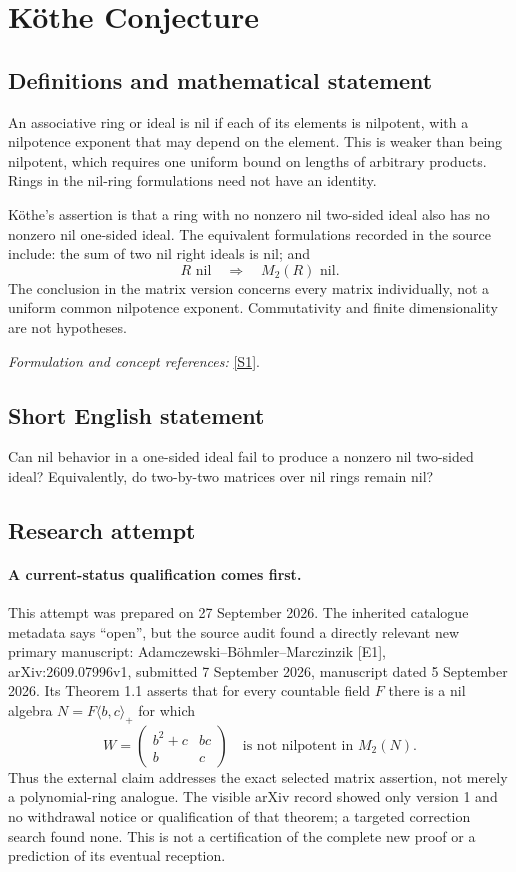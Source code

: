 \documentclass[11pt]{article}
\begin{document}
\section*{\texorpdfstring{Köthe Conjecture}{Köthe Conjecture}}\label{1103}
\subsection{Definitions and mathematical statement}
An associative ring or ideal is nil if each of its elements is nilpotent, with a nilpotence exponent that may depend on the element. This is weaker than being nilpotent, which requires one uniform bound on lengths of arbitrary products. Rings in the nil-ring formulations need not have an identity.

K\"othe's assertion is that a ring with no nonzero nil two-sided ideal also has no nonzero nil one-sided ideal. The equivalent formulations recorded in the source include: the sum of two nil right ideals is nil; and
\[
 R\text{ nil}\quad\Longrightarrow\quad M_2(R)\text{ nil}.
\]
The conclusion in the matrix version concerns every matrix individually, not a uniform common nilpotence exponent. Commutativity and finite dimensionality are not hypotheses.
\par\smallskip\textit{Formulation and concept references:} \href{https://www.mathunion.org/fileadmin/ICM/Proceedings/ICM2006.2/ICM2006.2.ocr.pdf}{[S1]}.

\subsection{Short English statement}
Can nil behavior in a one-sided ideal fail to produce a nonzero nil two-sided ideal? Equivalently, do two-by-two matrices over nil rings remain nil?
\subsection{Research attempt}
\paragraph{A current-status qualification comes first.}
This attempt was prepared on 27 September 2026. The inherited catalogue
metadata says ``open'', but the source audit found a directly relevant
new primary manuscript: Adamczewski--B\"ohmler--Marczinzik [E1],
arXiv:2609.07996v1, submitted 7 September 2026, manuscript dated
5 September 2026. Its Theorem 1.1 asserts that for every countable field
$F$ there is a nil algebra $N=F\langle b,c\rangle_+$ for which
\[
 W=\begin{pmatrix}b^2+c&bc\\ b&c\end{pmatrix}
 \quad\text{is not nilpotent in }M_2(N).
\]
Thus the external claim addresses the exact selected matrix assertion,
not merely a polynomial-ring analogue. The visible arXiv record showed
only version 1 and no withdrawal notice or qualification of that theorem;
a targeted correction search found none. This is not a certification of
the complete new proof or a prediction of its eventual reception.
\end{document}
